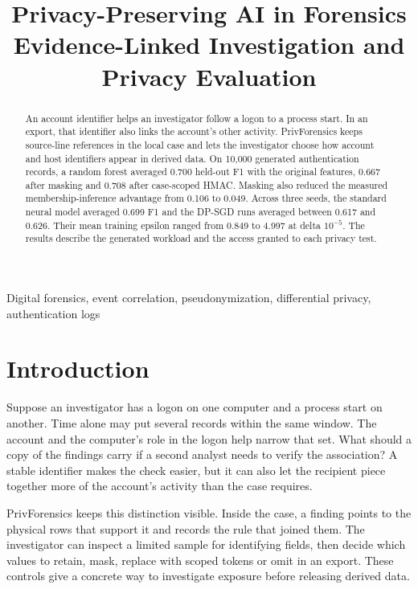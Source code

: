 \documentclass[conference]{IEEEtran}
\begin{document}
\title{Privacy-Preserving AI in Forensics\\Evidence-Linked Investigation and Privacy Evaluation}
\author{
}
\maketitle

\begin{abstract}
An account identifier helps an investigator follow a logon to a process start. In an export, that identifier also links the account's other activity. PrivForensics keeps source-line references in the local case and lets the investigator choose how account and host identifiers appear in derived data. On 10,000 generated authentication records, a random forest averaged 0.700 held-out F1 with the original features, 0.667 after masking and 0.708 after case-scoped HMAC. Masking also reduced the measured membership-inference advantage from 0.106 to 0.049. Across three seeds, the standard neural model averaged 0.699 F1 and the DP-SGD runs averaged between 0.617 and 0.626. Their mean training epsilon ranged from 0.849 to 4.997 at delta $10^{-5}$. The results describe the generated workload and the access granted to each privacy test.
\end{abstract}
\begin{IEEEkeywords}
Digital forensics, event correlation, pseudonymization, differential privacy, authentication logs
\end{IEEEkeywords}

\section{Introduction}
Suppose an investigator has a logon on one computer and a process start on another. Time alone may put several records within the same window. The account and the computer's role in the logon help narrow that set. What should a copy of the findings carry if a second analyst needs to verify the association? A stable identifier makes the check easier, but it can also let the recipient piece together more of the account's activity than the case requires.

PrivForensics keeps this distinction visible. Inside the case, a finding points to the physical rows that support it and records the rule that joined them. The investigator can inspect a limited sample for identifying fields, then decide which values to retain, mask, replace with scoped tokens or omit in an export. These controls give a concrete way to investigate exposure before releasing derived data.
\end{document}
